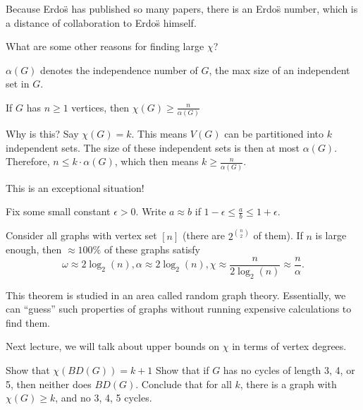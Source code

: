 \begin{note}
	Because Erdo\"s has published so many papers, there is an Erdo\"s number, which is a distance of collaboration to Erdo\"s himself.
\end{note}

What are some other reasons for finding large \( \chi \)?

\begin{definition}
	\( \alpha(G) \) denotes the independence number of \( G \), the max size of an independent set in \( G \).
\end{definition}

\begin{property}
	If \( G \) has \( n \ge 1 \) vertices, then \( \chi (G) \ge \frac{n}{\alpha (G)} \)
\end{property}

Why is this? Say \( \chi(G) = k \). This means \( V(G) \) can be partitioned into \( k \) independent sets. The size of these independent sets is then at most \( \alpha(G) \). Therefore, \( n \le k \cdot \alpha (G) \), which then means \( k \ge  \frac{n}{\alpha (G)} \).

This is an exceptional situation!

\begin{notation}
	Fix some small constant \( \epsilon >0 \). Write \( a \approx b \) if \( 1 - \epsilon  \le  \frac{a}{b} \le  1 + \epsilon  \). 
\end{notation}

\begin{theorem}
	Consider all graphs with vertex set \( [n] \) (there are \( 2^{\binom{n}{2}} \) of them). If \( n \) is large enough, then \( \approx 100\% \) of these graphs satisfy \[
		\omega \approx 2\log_2(n), \alpha \approx 2\log_2(n), \chi \approx \frac{n}{2\log_2(n)} \approx \frac{n}{\alpha }
	.\] 
\end{theorem}

This theorem is studied in an area called random graph theory. Essentially, we can ``guess'' such properties of graphs without running expensive calculations to find them.

Next lecture, we will talk about upper bounds on \( \chi  \) in terms of vertex degrees.

Show that \( \chi(BD(G)) = k + 1 \)
Show that if \( G \) has no cycles of length 3, 4, or 5, then neither does \( BD(G) \). Conclude that for all \( k \), there is a graph with \( \chi(G) \ge  k \), and no 3, 4, 5 cycles.

